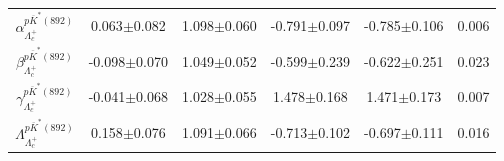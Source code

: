\begin{table}[h]
{\begin{tabular}{cccccc}
            $\alpha_{\Lambda_c^+}^{p\overline{K}^*(892)}$ & 0.063$\pm$0.082 & 1.098$\pm$0.060 & -0.791$\pm$0.097 & -0.785$\pm$0.106 & 0.006\\
            $\beta_{\Lambda_c^+}^{p\overline{K}^*(892)}$ & -0.098$\pm$0.070 & 1.049$\pm$0.052 & -0.599$\pm$0.239 & -0.622$\pm$0.251 & 0.023\\
            $\gamma_{\Lambda_c^+}^{p\overline{K}^*(892)}$ & -0.041$\pm$0.068 & 1.028$\pm$0.055 & 1.478$\pm$0.168 & 1.471$\pm$0.173 & 0.007\\
            $\Lambda_{\Lambda_c^+}^{p\overline{K}^*(892)}$ & 0.158$\pm$0.076 & 1.091$\pm$0.066 & -0.713$\pm$0.102 & -0.697$\pm$0.111 & 0.016\\
        \hline\hline
        \end{tabular}
        }
\end{table}

